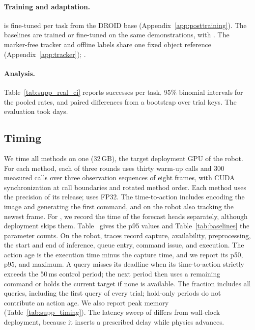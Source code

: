 \paragraph{Training and adaptation.} \ours is fine-tuned per task from the DROID base
(Appendix~\ref{app:posttraining}). The baselines are trained or fine-tuned on the
same demonstrations, with .
The marker-free tracker and offline labels share one fixed object reference
(Appendix~\ref{app:tracker}); .

\paragraph{Analysis.} Table~\ref{tab:supp_real_ci} reports successes per task, 95\% binomial intervals
for the pooled rates, and paired differences from a bootstrap over trial keys. The
evaluation took  days.



\subsection{Timing}
\label{app:timing}
We time all methods on one \cfgGPU{} (32\,GB), the target deployment GPU of the robot. For each
method, each of three rounds uses thirty warm-up calls and 300 measured calls
over three observation sequences of eight frames, with CUDA synchronization at
call boundaries and rotated method order. Each method uses the precision of
its release; \ours uses FP32. The time-to-action includes encoding the image and generating the
first command, and on the robot also tracking the newest frame. For \ours, we
record the time of the forecast heads separately, although deployment skips them.
Table~ gives the p95 values and Table~\ref{tab:baselines} the
parameter counts. On the robot, traces record capture, availability,
preprocessing, the start and end of inference, queue entry, command issue, and
execution. The action age is the execution time minus the capture time, and we
report its p50, p95, and maximum. A query misses its deadline when its
time-to-action strictly exceeds the 50\,ms control period; the next period then
uses a remaining command or holds the current target if none is available.
The fraction includes all queries, including the first query of every trial;
hold-only periods do not contribute an action age. We also report peak memory
(Table~\ref{tab:supp_timing}). The latency sweep of \bench differs
from wall-clock deployment, because it inserts a prescribed delay while physics
advances.



